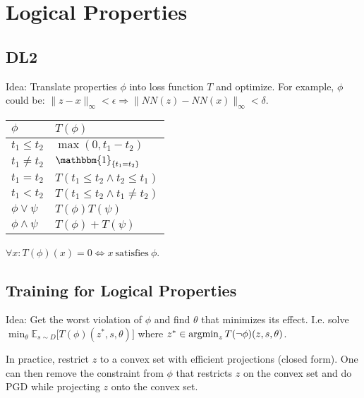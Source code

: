 \section{Logical Properties}
\subsection*{DL2}
Idea: Translate properties $\phi$ into loss function $T$ and optimize.
For example, $\phi$ could be: $\|z-x\|_{\infty}<\epsilon \Rightarrow \|NN(z)-NN(x)\|_{\infty}<\delta$.


\vspace*{1mm}
\renewcommand{\arraystretch}{1.1}
\begin{tabular}{ll}
    \hline
    $\phi $           & $T(\phi)$                            \\
    \hline
    $t_1 \leq t_2$    & $\max(0, t_1 - t_2)$                 \\
    $t_1 \neq t_2$    & $\mathbbm{1}_{\{t_1 = t_2\}}$        \\
    $t_1 = t_2$       & $T(t_1 \leq t_2 \land t_2 \leq t_1)$ \\
    $t_1 < t_2$       & $T(t_1 \leq t_2 \land t_1 \neq t_2)$ \\
    $\phi \lor \psi$  & $T(\phi) T(\psi)$                    \\
    $\phi \land \psi$ & $T(\phi) + T(\psi)$                  \\
    \hline
\end{tabular}
\vspace*{1mm}
$\forall x: T(\phi)(x) = 0 \Leftrightarrow x\ \text{satisfies}\ \phi$.

\subsection*{Training for Logical Properties}
Idea: Get the worst violation of $\phi$ and find $\theta$ that minimizes its effect. I.e. solve {$\min_\theta\mathbb{E}_{s \sim D} \big[ T(\phi)(z^*, s, \theta) \big]$} where {$z^* \in \operatorname{\operatorname{argmin}}_z T(\lnot \phi)(z, s, \theta)$}.

In practice, restrict $z$ to a convex set with efficient projections (closed form). One can then remove the constraint from $\phi$ that restricts $z$ on the convex set and do PGD while projecting $z$ onto the convex set.
